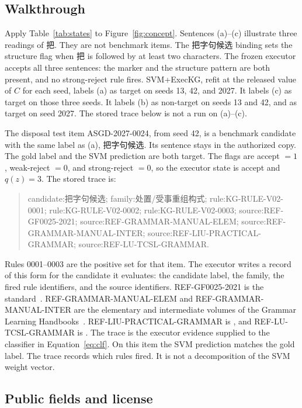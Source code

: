 \documentclass[pdflatex,sn-mathphys,NameDate]{sn-jnl}
\begin{document}
\subsection{Walkthrough}
\label{sec:walkthrough}

Apply Table~\ref{tab:states} to Figure~\ref{fig:concept}.
Sentences (a)--(c) illustrate three readings of \mbox{把}.
They are not benchmark items.
The \mbox{把字句候选} binding sets the structure flag when \mbox{把} is followed by at least two characters.
The frozen executor accepts all three sentences: the marker and the structure pattern are both present, and no strong-reject rule fires.
SVM+ExecKG, refit at the released value of $C$ for each seed, labels (a) as target on seeds 13, 42, and 2027.
It labels (c) as target on those three seeds.
It labels (b) as non-target on seeds 13 and 42, and as target on seed 2027.
The stored trace below is not a run on (a)--(c).

The disposal test item ASGD-2027-0024, from seed 42, is a benchmark candidate with the same label as (a), \mbox{把字句候选}.
Its sentence stays in the authorized copy.
The gold label and the SVM prediction are both target.
The flags are accept $=1$, weak-reject $=0$, and strong-reject $=0$, so the executor state is accept and $q(z)=3$.
The stored trace is:
\begin{quote}\raggedright\footnotesize
candidate:把字句候选; family:处置/受事重组构式;
rule:KG-RULE-V02-0001; rule:KG-RULE-V02-0002; rule:KG-RULE-V02-0003;
source:REF-GF0025-2021; source:REF-GRAMMAR-MANUAL-ELEM;
source:REF-GRAMMAR-MANUAL-INTER; source:REF-LIU-PRACTICAL-GRAMMAR;
source:REF-LU-TCSL-GRAMMAR.
\end{quote}
Rules 0001--0003 are the positive set for that item.
The executor writes a record of this form for the candidate it evaluates: the candidate label, the family, the fired rule identifiers, and the source identifiers.
REF-GF0025-2021 is the standard~\citep{moe2021gf}.
REF-GRAMMAR-MANUAL-ELEM and REF-GRAMMAR-MANUAL-INTER are the elementary and intermediate volumes of the Grammar Learning Handbooks~\citep{cti2022handbooks}.
REF-LIU-PRACTICAL-GRAMMAR is \citet{liuPractical}, and REF-LU-TCSL-GRAMMAR is \citet{luTcsl}.
The trace is the executor evidence supplied to the classifier in Equation~\ref{eq:clf}.
On this item the SVM prediction matches the gold label.
The trace records which rules fired.
It is not a decomposition of the SVM weight vector.

\subsection{Public fields and license}
\end{document}
